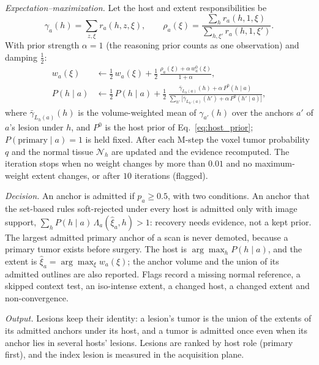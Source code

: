 \documentclass[fleqn,10pt]{olplainarticle}
\begin{document}
\emph{Expectation--maximization.} Let the host and extent responsibilities be
\begin{equation*}
\gamma_a(h)=\sum_{z,\xi}r_a(h,z,\xi),\qquad
\rho_a(\xi)=\frac{\sum_h r_a(h,1,\xi)}{\sum_{h,\xi'}r_a(h,1,\xi')}.
\end{equation*}
With prior strength $\alpha=1$ (the reasoning prior counts as one observation) and damping $\tfrac12$:
\begin{equation}
\label{eq:mstep}
\begin{aligned}
w_a(\xi)&\leftarrow\tfrac12\,w_a(\xi)+\tfrac12\,\frac{\rho_a(\xi)+\alpha\,w^{0}_a(\xi)}{1+\alpha},\\
P(h\mid a)&\leftarrow\tfrac12\,P(h\mid a)+\tfrac12\,\frac{\bar\gamma_{L_h(a)}(h)+\alpha\,P^{0}(h\mid a)}{\sum_{h'}\bigl[\bar\gamma_{L_{h'}(a)}(h')+\alpha\,P^{0}(h'\mid a)\bigr]},
\end{aligned}
\end{equation}
where $\bar\gamma_{L_h(a)}(h)$ is the volume-weighted mean of $\gamma_{a'}(h)$ over the anchors $a'$ of $a$'s lesion under $h$, and
$P^{0}$ is the host prior of Eq.~\eqref{eq:host_prior}; $P(\text{primary}\mid a)=1$ is held fixed. After each M-step the voxel
tumor probability $q$ and the normal tissue $\mathcal{N}_h$ are updated and the evidence recomputed. The iteration stops when no
weight changes by more than $0.01$ and no maximum-weight extent changes, or after $10$ iterations (flagged).

\emph{Decision.} An anchor is admitted if $p_a\ge0.5$, with two conditions. An anchor that the set-based rules soft-rejected
under every host is admitted only with image support, $\sum_h P(h\mid a)\,\Lambda_a(\hat\xi_a,h)>1$: recovery needs evidence, not
a kept prior. The largest admitted primary anchor of a scan is never demoted, because a primary tumor exists before surgery.
The host is $\arg\max_h P(h\mid a)$, and the extent is $\hat\xi_a=\arg\max_\xi w_a(\xi)$; the anchor volume and the union of its
admitted outlines are also reported. Flags record a missing normal reference, a skipped context test, an iso-intense extent, a
changed host, a changed extent and non-convergence.

\emph{Output.} Lesions keep their identity: a lesion's tumor is the union of the extents of its admitted anchors under its
host, and a tumor is admitted once even when its anchor lies in several hosts' lesions. Lesions are ranked by host role
(primary first), and the index lesion is measured in the acquisition plane.

\end{document}
